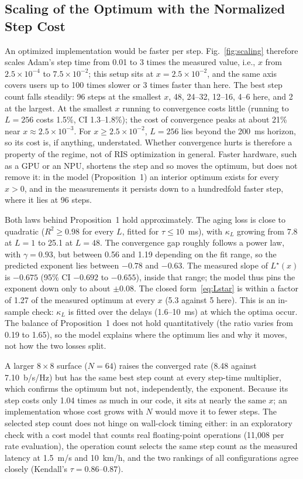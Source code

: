 \subsection{Scaling of the Optimum with the Normalized Step Cost}
\label{sec:res_scaling}
An optimized implementation would be faster per step. Fig.~\ref{fig:scaling} therefore scales Adam's step time from 0.01 to 3 times the measured value, i.e., $x$ from $2.5\times10^{-4}$ to $7.5\times10^{-2}$; this setup sits at $x=2.5\times10^{-2}$, and the same axis covers users up to 100 times slower or 3 times faster than here. The best step count falls steadily: 96 steps at the smallest $x$, 48, 24--32, 12--16, 4--6 here, and 2 at the largest. At the smallest $x$ running to convergence costs little (running to $L=256$ costs 1.5\%, CI 1.3--1.8\%); the cost of convergence peaks at about 21\% near $x\approx 2.5\times10^{-3}$. For $x\ge 2.5\times10^{-2}$, $L=256$ lies beyond the 200~ms horizon, so its cost is, if anything, understated. Whether convergence hurts is therefore a property of the regime, not of RIS optimization in general. Faster hardware, such as a GPU or an NPU, shortens the step and so moves the optimum, but does not remove it: in the model (Proposition~1) an interior optimum exists for every $x>0$, and in the measurements it persists down to a hundredfold faster step, where it lies at 96 steps.

Both laws behind Proposition~1 hold approximately. The aging loss is close to quadratic ($R^2\ge 0.98$ for every $L$, fitted for $\tau\le 10$~ms), with $\kappa_L$ growing from 7.8 at $L=1$ to 25.1 at $L=48$. The convergence gap roughly follows a power law, with $\gamma=0.93$, but between 0.56 and 1.19 depending on the fit range, so the predicted exponent lies between $-0.78$ and $-0.63$. The measured slope of $L^\star(x)$ is $-0.675$ (95\% CI $-0.692$ to $-0.655$), inside that range; the model thus pins the exponent down only to about $\pm 0.08$. The closed form~\eqref{eq:Lstar} is within a factor of 1.27 of the measured optimum at every $x$ (5.3 against 5 here). This is an in-sample check: $\kappa_L$ is fitted over the delays (1.6--10~ms) at which the optima occur. The balance of Proposition~1 does not hold quantitatively (the ratio varies from 0.19 to 1.65), so the model explains where the optimum lies and why it moves, not how the two losses split.

A larger $8\times 8$ surface ($N=64$) raises the converged rate (8.48 against 7.10~b/s/Hz) but has the same best step count at every step-time multiplier, which confirms the optimum but not, independently, the exponent. Because its step costs only 1.04 times as much in our code, it sits at nearly the same $x$; an implementation whose cost grows with $N$ would move it to fewer steps. The selected step count does not hinge on wall-clock timing either: in an exploratory check with a cost model that counts real floating-point operations (11{,}008 per rate evaluation), the operation count selects the same step count as the measured latency at 1.5~m/s and 10~km/h, and the two rankings of all configurations agree closely (Kendall's $\tau=0.86$--$0.87$).

